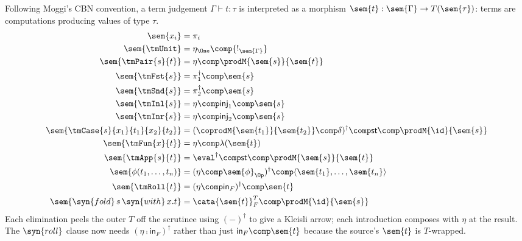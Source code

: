 Following Moggi's CBN convention, a term judgement $\Gamma \vdash t : \tau$ is interpreted as a
morphism $\sem{t} : \sem{\Gamma} \to T(\sem{\tau})$: terms are computations producing values of
type $\tau$.
\begin{align*}
\sem{x_i}                              & = \pi_i \\
\sem{\tmUnit}                          & = \eta_{\One} \comp {!_{\sem{\Gamma}}} \\
\sem{\tmPair{s}{t}}                    & = \eta \comp \prodM{\sem{s}}{\sem{t}} \\
\sem{\tmFst{s}}                        & = \pi_1^\dagger \comp \sem{s} \\
\sem{\tmSnd{s}}                        & = \pi_2^\dagger \comp \sem{s} \\
\sem{\tmInl{s}}                        & = \eta \comp \mathsf{inj}_1 \comp \sem{s} \\
\sem{\tmInr{s}}                        & = \eta \comp \mathsf{inj}_2 \comp \sem{s} \\
\sem{\tmCase{s}{x_1}{t_1}{x_2}{t_2}}   & = (\coprodM{\sem{t_1}}{\sem{t_2}} \comp \delta)^\dagger
                                            \comp \mathsf{st} \comp \prodM{\id}{\sem{s}} \\
\sem{\tmFun{x}{t}}                     & = \eta \comp \lambda(\sem{t}) \\
\sem{\tmApp{s}{t}}                     & = \eval^\dagger \comp \mathsf{st} \comp \prodM{\sem{s}}{\sem{t}} \\
\sem{\phi(t_1, \ldots, t_n)}           & = (\eta \comp \sem{\phi}_{\Op})^\dagger \comp
                                            \langle\sem{t_1}, \ldots, \sem{t_n}\rangle \\
\sem{\tmRoll{t}}                       & = (\eta \comp \mathsf{in}_F)^\dagger \comp \sem{t} \\
\sem{\syn{fold}\,s\,\syn{with}\,x.t}   & = \cata{\sem{t}}_F^T \comp \prodM{\id}{\sem{s}}
\end{align*}
Each elimination peels the outer $T$ off the scrutinee using $(-)^\dagger$ to give a Kleisli
arrow; each introduction composes with $\eta$ at the result. The $\syn{roll}$ clause now needs
$(\eta \comp \mathsf{in}_F)^\dagger$ rather than just $\mathsf{in}_F \comp \sem{t}$ because the
source's $\sem{t}$ is $T$-wrapped.

